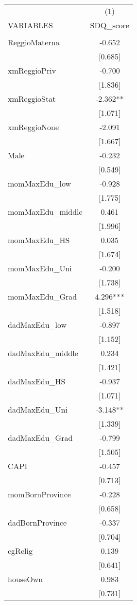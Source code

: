 \documentclass[]{article}
\begin{document}
\begin{tabular}{lc} \hline
 & (1) \\
VARIABLES & SDQ\_score \\ \hline
 &  \\
ReggioMaterna & -0.652 \\
 & [0.685] \\
xmReggioPriv & -0.700 \\
 & [1.836] \\
xmReggioStat & -2.362** \\
 & [1.071] \\
xmReggioNone & -2.091 \\
 & [1.667] \\
Male & -0.232 \\
 & [0.549] \\
momMaxEdu\_low & -0.928 \\
 & [1.775] \\
momMaxEdu\_middle & 0.461 \\
 & [1.996] \\
momMaxEdu\_HS & 0.035 \\
 & [1.674] \\
momMaxEdu\_Uni & -0.200 \\
 & [1.738] \\
momMaxEdu\_Grad & 4.296*** \\
 & [1.518] \\
dadMaxEdu\_low & -0.897 \\
 & [1.152] \\
dadMaxEdu\_middle & 0.234 \\
 & [1.421] \\
dadMaxEdu\_HS & -0.937 \\
 & [1.071] \\
dadMaxEdu\_Uni & -3.148** \\
 & [1.339] \\
dadMaxEdu\_Grad & -0.799 \\
 & [1.505] \\
CAPI & -0.457 \\
 & [0.713] \\
momBornProvince & -0.228 \\
 & [0.658] \\
dadBornProvince & -0.337 \\
 & [0.704] \\
cgRelig & 0.139 \\
 & [0.641] \\
houseOwn & 0.983 \\
 & [0.731] \\

\end{tabular}
\end{document}
